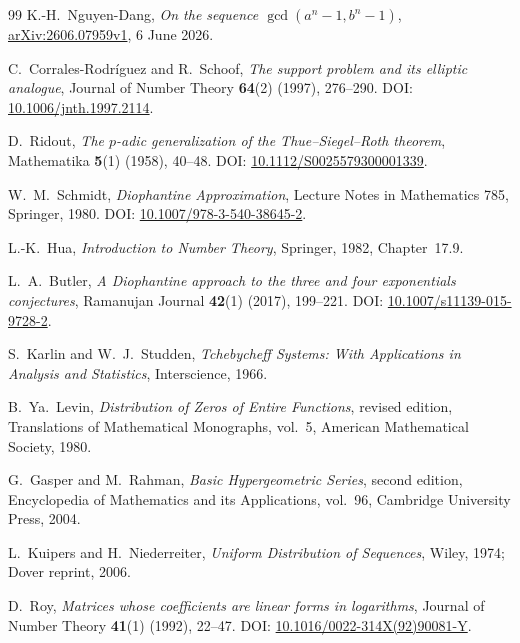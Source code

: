 \documentclass[11pt,oneside]{article}
\theoremstyle{definition}
\theoremstyle{remark}
\begin{document}
\begin{thebibliography}{99}
K.-H.~Nguyen-Dang,
\newblock \emph{On the sequence $\gcd(a^n-1,b^n-1)$},
\newblock \href{https://arxiv.org/abs/2606.07959}{arXiv:2606.07959v1}, 6 June 2026.

C.~Corrales-Rodr\'iguez and R.~Schoof,
\newblock \emph{The support problem and its elliptic analogue},
\newblock Journal of Number Theory \textbf{64}(2) (1997), 276--290.
\newblock DOI:
\href{https://doi.org/10.1006/jnth.1997.2114}{10.1006/jnth.1997.2114}.

D.~Ridout,
\newblock \emph{The $p$-adic generalization of the Thue--Siegel--Roth theorem},
\newblock Mathematika \textbf{5}(1) (1958), 40--48.
\newblock DOI:
\href{https://doi.org/10.1112/S0025579300001339}{10.1112/S0025579300001339}.

W.~M.~Schmidt,
\newblock \emph{Diophantine Approximation},
\newblock Lecture Notes in Mathematics 785, Springer, 1980.
\newblock DOI:
\href{https://doi.org/10.1007/978-3-540-38645-2}{10.1007/978-3-540-38645-2}.

L.-K.~Hua,
\newblock \emph{Introduction to Number Theory},
\newblock Springer, 1982, Chapter~17.9.

L.~A.~Butler,
\newblock \emph{A Diophantine approach to the three and four exponentials conjectures},
\newblock Ramanujan Journal \textbf{42}(1) (2017), 199--221.
\newblock DOI: \href{https://doi.org/10.1007/s11139-015-9728-2}{10.1007/s11139-015-9728-2}.

S.~Karlin and W.~J.~Studden,
\newblock \emph{Tchebycheff Systems: With Applications in Analysis and Statistics},
\newblock Interscience, 1966.

B.~Ya.~Levin,
\newblock \emph{Distribution of Zeros of Entire Functions},
\newblock revised edition, Translations of Mathematical Monographs, vol.~5,
American Mathematical Society, 1980.

G.~Gasper and M.~Rahman,
\newblock \emph{Basic Hypergeometric Series}, second edition,
\newblock Encyclopedia of Mathematics and its Applications, vol.~96,
Cambridge University Press, 2004.

L.~Kuipers and H.~Niederreiter,
\newblock \emph{Uniform Distribution of Sequences},
\newblock Wiley, 1974; Dover reprint, 2006.

D.~Roy,
\newblock \emph{Matrices whose coefficients are linear forms in logarithms},
\newblock Journal of Number Theory \textbf{41}(1) (1992), 22--47.
\newblock DOI:
\href{https://doi.org/10.1016/0022-314X(92)90081-Y}{10.1016/0022-314X(92)90081-Y}.


\end{thebibliography}
\end{document}
